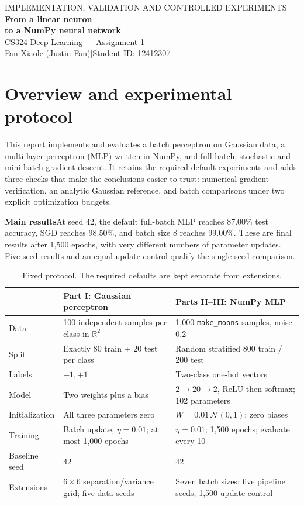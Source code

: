 \documentclass[10pt,a4paper]{article}
\newcommand{\finding}[2]{\begin{tcolorbox}\textbf{\textcolor{clay}{#1}}\quad #2\end{tcolorbox}}
\newcommand{\code}[1]{\texttt{\small #1}}
\begin{document}
{\small\textcolor{clay}{IMPLEMENTATION, VALIDATION AND CONTROLLED EXPERIMENTS}}\\[5pt]
{\huge\bfseries From a linear neuron\\[2pt] to a NumPy neural network}\\[8pt]
{\large CS324 Deep Learning --- Assignment 1}\\[4pt]
Fan Xiaole (Justin Fan)\quad |\quad Student ID: 12412307

\section{Overview and experimental protocol}
This report implements and evaluates a batch perceptron on Gaussian data, a
multi-layer perceptron (MLP) written in NumPy, and full-batch, stochastic and
mini-batch gradient descent. It retains the required default experiments and
adds three checks that make the conclusions easier to trust: numerical gradient
verification, an analytic Gaussian reference, and batch comparisons under two
explicit optimization budgets.
\finding{Main results}{At seed 42, the default full-batch MLP reaches
87.00\% test accuracy, SGD reaches
98.50\%, and batch size 8 reaches
99.00\%. These are final results after 1,500 epochs,
with very different numbers of parameter updates. Five-seed results and an
equal-update control qualify the single-seed comparison.}
\begin{table}[H]\small\centering
\caption{Fixed protocol. The required defaults are kept separate from extensions.}
\begin{tabularx}{\linewidth}{@{}p{31mm}XX@{}}\toprule
 & Part I: Gaussian perceptron & Parts II--III: NumPy MLP\\\midrule
Data & 100 independent samples per class in $\mathbb R^2$ & 1,000 \code{make\_moons} samples, noise 0.2\\
Split & Exactly 80 train + 20 test per class & Random stratified 800 train / 200 test\\
Labels & $-1,+1$ & Two-class one-hot vectors\\
Model & Two weights plus a bias & $2\to20\to2$, ReLU then softmax; 102 parameters\\
Initialization & All three parameters zero & $W=0.01\,\mathcal N(0,1)$; zero biases\\
Training & Batch update, $\eta=0.01$; at most 1,000 epochs & $\eta=0.01$; 1,500 epochs; evaluate every 10\\
Baseline seed & 42 & 42\\
Extensions & $6\times6$ separation/variance grid; five data seeds & Seven batch sizes; five pipeline seeds; 1,500-update control\\\bottomrule
\end{tabularx}\end{table}
\end{document}
